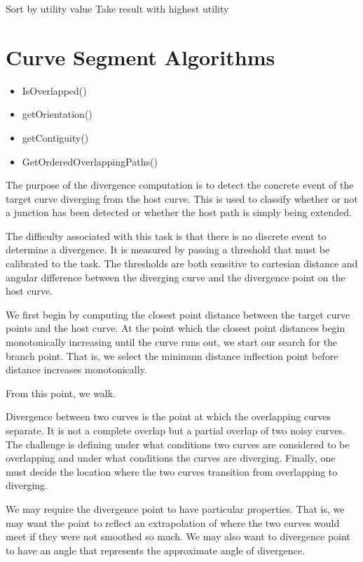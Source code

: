 Sort by utility value
Take result with highest utility

\section{Curve Segment Algorithms}
\label{curvesegmentalgorithms}

\begin{itemize}
\item IsOverlapped()

\item getOrientation()

\item getContiguity()

\item GetOrderedOverlappingPaths()

\end{itemize}

The purpose of the divergence computation is to detect the concrete event of the target curve diverging from the host curve. This is used to classify whether or not a junction has been detected or whether the host path is simply being extended.

The difficulty associated with this task is that there is no discrete event to determine a divergence. It is measured by passing a threshold that must be calibrated to the task. The thresholds are both sensitive to cartesian distance and angular difference between the diverging curve and the divergence point on the host curve.

We first begin by computing the closest point distance between the target curve points and the host curve. At the point which the closest point distances begin monotonically increasing until the curve runs out, we start our search for the branch point. That is, we select the minimum distance inflection point before distance increases monotonically.

From this point, we walk.

Divergence between two curves is the point at which the overlapping curves separate. It is not a complete overlap but a partial overlap of two noisy curves. The challenge is defining under what conditions two curves are considered to be overlapping and under what conditions the curves are diverging. Finally, one must decide the location where the two curves transition from overlapping to diverging. 

We may require the divergence point to have particular properties. That is, we may want the point to reflect an extrapolation of where the two curves would meet if they were not smoothed so much. We may also want to divergence point to have an angle that represents the approximate angle of divergence. 

